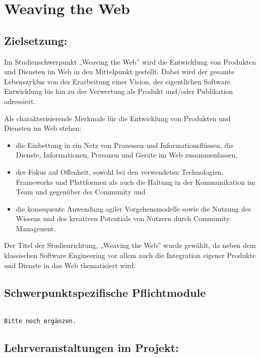 \chapter{Weaving the Web}\label{weaving-the-web}

\section*{Zielsetzung:}\label{zielsetzung-1}

Im Studienschwerpunkt „Weaving the Web'' wird die Entwicklung von
Produkten und Diensten im Web in den Mittelpunkt gestellt. Dabei wird
der gesamte Lebenszyklus von der Erarbeitung einer Vision, der
eigentlichen Software Entwicklung bis hin zu der Verwertung als Produkt
und/oder Publikation adressiert.

Als charakterisierende Merkmale für die Entwicklung von Produkten und
Diensten im Web stehen:

\begin{itemize}
\item
  die Einbettung in ein Netz von Prozessen und Informationsflüssen, die
  Dienste, Informationen, Personen und Geräte im Web zusammenfassen,
\item
  der Fokus auf Offenheit, sowohl bei den verwendeten Technologien,
  Frameworks und Plattformen als auch die Haltung in der Kommunikation
  im Team und gegenüber der Community und
\item
  die konsequente Anwendung agiler Vorgehensmodelle sowie die Nutzung
  des Wissens und des kreativen Potentials von Nutzern durch Community
  Managenent.
\end{itemize}

Der Titel der Studienrichtung, „Weaving the Web'' wurde gewählt, da
neben dem klassischen Software Engineering vor allem auch die
Integration eigener Produkte und Dienste in das Web thematisiert wird.

\section*{Schwerpunktspezifische
Pflichtmodule}\label{schwerpunktspezifische-pflichtmodule-4}

\begin{verbatim}

Bitte noch ergänzen.
\end{verbatim}

\section*{Lehrveranstaltungen im
Projekt:}\label{lehrveranstaltungen-im-projekt-3}


